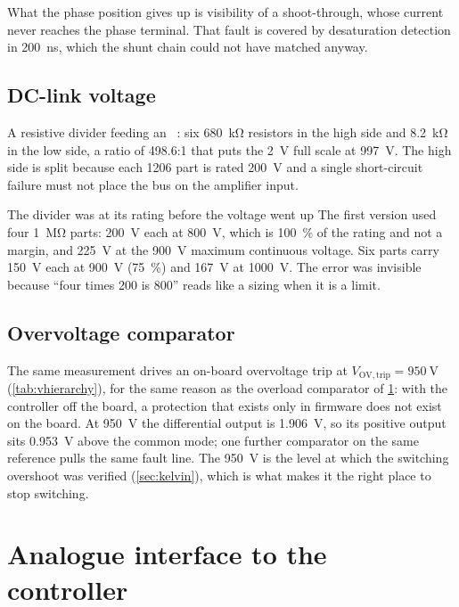 What the phase position gives up is visibility of a shoot-through, whose
current never reaches the phase terminal. That fault is covered by
desaturation detection in \SI{200}{\nano\second}, which the shunt chain
could not have matched anyway.

\subsection{DC-link voltage}
\label{sec:dclinkv}

A resistive divider feeding an \isoampv{}~\cite{ti_amc1311}: six
\SI{680}{\kilo\ohm} resistors in the high side and \SI{8.2}{\kilo\ohm} in the
low side, a ratio of \num{498.6}:1 that puts the \SI{2}{\volt} full scale at
\SI{997}{\volt}. The high side is split because each 1206 part is rated
\SI{200}{\volt} and a single short-circuit failure must not place the bus on
the amplifier input.

\begin{finding}{The divider was at its rating before the voltage went up}
The first version used four \SI{1}{\mega\ohm} parts: \SI{200}{\volt} each
at \SI{800}{\volt}, which is \SI{100}{\percent} of the rating and not a
margin, and \SI{225}{\volt} at the \SI{900}{\volt} maximum continuous
voltage. Six parts carry \SI{150}{\volt} each at \SI{900}{\volt}
(\SI{75}{\percent}) and \SI{167}{\volt} at \SI{1000}{\volt}. The error was
invisible because ``four times \SI{200}{} is \SI{800}{}'' reads like a
sizing when it is a limit.
\end{finding}

\subsection{Overvoltage comparator}

The same measurement drives an on-board overvoltage trip at
$V_\mathrm{OV,trip} = \SI{950}{\volt}$ (\cref{tab:vhierarchy}), for the same
reason as the overload comparator of \cref{sec:analogif}: with the
controller off the board, a protection that exists only in firmware does not
exist on the board. At \SI{950}{\volt} the \isoampv{} differential output
is \SI{1.906}{\volt}, so its positive output sits \SI{0.953}{\volt} above
the common mode; one further comparator on the same reference pulls the
same fault line. The \SI{950}{\volt} is the level at which the switching
overshoot was verified (\cref{sec:kelvin}), which is what makes it the
right place to stop switching.

\section{Analogue interface to the controller}
\label{sec:analogif}

